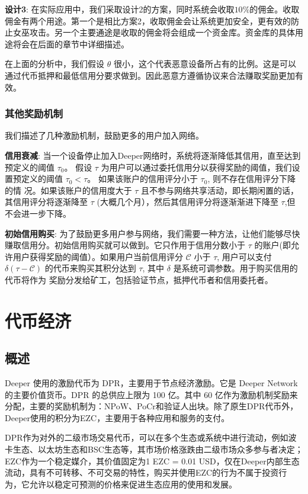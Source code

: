 \documentclass[a4paper]{article}
\begin{document}
\textbf{设计3}: 在实际应用中，我们采取设计2的方案，同时系统会收取$10\%$的佣金。收取佣金有两个用途。第一个是相比方案2，收取佣金会让系统更加安全，更有效的防止女巫攻击。另一个主要通途是收取的佣金将会组成一个资金库。资金库的具体用途将会在后面的章节中详细描述。

在上面的分析中，我们假设 $\theta$ 很小，这个代表恶意设备所占有的比例。这是可以通过代币抵押和最低信用分要求做到。因此恶意方遵循协议来合法赚取奖励更加有效。

\subsubsection{其他奖励机制}
我们描述了几种激励机制，鼓励更多的用户加入网络。

\textbf{信用衰减}: 当一个设备停止加入Deeper网络时，系统将逐渐降低其信用，直至达到预定义的阈值 $\tau_0$。 假设 $\tau$ 为用户可以通过委托信用分以获得奖励的阈值，我们设置预定义的阈值 $\tau_0 < \tau$。 如果该账户的信用评分小于 $\tau_0$, 则不存在信用评分下降的情
况。如果该账户的信用度大于 $\tau$ 且不参与网络共享活动，即长期闲置的话，其信用评分将逐渐降至 $\tau$ (大概几个月），然后其信用评分将逐渐渐进下降至 $\tau$,但不会进一步下降。

\textbf{初始信用购买}: 为了鼓励更多用户参与网络，我们需要一种方法，让他们能够尽快赚取信用分。初始信用购买就可以做到。它只作用于信用分数小于 $\tau$ 的账户(即允许用户获得奖励的阈值）。如果用户当前信用评分 $\mathcal{C}$ 小于 $\tau$, 用户可以支付 $\delta(\tau-\mathcal{C})$ 的代币来购买其积分达到 $\tau$, 其中 $\delta$ 是系统可调参数。用于购买信用的代币将作为 奖励分发给矿工，包括验证节点，抵押代币者和信用委托者。

\newpage
\section{代币经济}
\subsection{概述}
Deeper 使用的激励代币为 DPR，主要用于节点经济激励。它是 Deeper Network 的主要价值货币。DPR 的总供应上限为 100 亿。其中 60 亿作为激励机制奖励来分配，主要的奖励机制为：NPoW、PoCr和验证人出块。除了原生DPR代币外，Deeper使用的积分为EZC，主要用于各种应用和服务的支付。

DPR作为对外的二级市场交易代币，可以在多个生态或系统中进行流动，例如波卡生态、以太坊生态和BSC生态等，其市场价格涨跌由二级市场众多参与者决定；EZC作为一个稳定媒介，其价值固定为1 EZC = 0.01 USD，仅在Deeper内部生态流动，具有不可转移、不可交易的特性，购买并使用EZC的行为不属于投资行为，它允许以稳定可预测的价格来促进生态应用的使用和发展。
\end{document}
